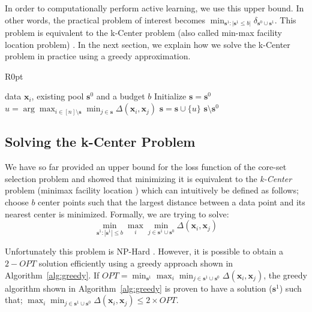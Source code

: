 \documentclass{article} \usepackage{iclr2018_conference,times}
\begin{document}
In order to computationally perform active learning, we use this upper bound. In other words, the practical problem of interest becomes $\min_{\mathbf{s}^1:|\mathbf{s}^1 \leq b|} \delta_{\mathbf{s}^0\cup \mathbf{s}^1}$. This problem is equivalent to the k-Center problem (also called min-max facility location problem) \citep{facility}. In the next section, we explain how we solve the k-Center problem in practice using a greedy approximation.{\par}

\begin{wrapfigure}{R}{0pt}
\begin{minipage}{0.44\textwidth}
\vspace{-8mm}
   \begin{algorithm}[H] 
   \caption{k-Center-Greedy} 
   \label{alg:greedy} 
   \begin{algorithmic} 
    data $\mathbf{x}_i$, existing pool $\mathbf{s}^0$ and a budget $b$ 
   \STATE Initialize $\mathbf{s}=\mathbf{s}^0$ \REPEAT \STATE $u=\arg\max_{i \in [n] \setminus \mathbf{s}} \min_{j \in \mathbf{s}} \Delta(\mathbf{x}_i, \mathbf{x}_j)$ \STATE $\mathbf{s} = \mathbf{s} \cup \{u\}$ 
    $\mathbf{s} \setminus \mathbf{s}^0$ \end{algorithmic}
\end{algorithm} 
\vspace{-10mm}
\end{minipage} 
\end{wrapfigure}  

\subsection{Solving the k-Center Problem} 
\label{sec:alg} 
We have so far provided an upper bound for the loss function of the core-set selection problem and showed that minimizing it is equivalent to the \emph{k-Center} problem (minimax facility location \citep{facility}) which can intuitively be defined as follows; choose $b$ center points such that the  largest distance between a data point and its nearest center is minimized. Formally, we are trying to solve: 
\begin{equation}
    \min_{\mathbf{s}^1:|\mathbf{s}^1| \leq b} \max_i \min_{j \in \mathbf{s}^1 \cup \mathbf{s}^0} \Delta(\mathbf{x}_i,\mathbf{x}_j)
\end{equation}

Unfortunately this problem is NP-Hard \citep{cook}. However, it is possible to obtain a $2-OPT$ solution efficiently
using a greedy approach shown in  Algorithm~\ref{alg:greedy}. If $OPT=\min_{\mathbf{s}^1} \max_i \min_{j \in
\mathbf{s}^1 \cup \mathbf{s}^0} \Delta(\mathbf{x}_i,\mathbf{x}_j)$, the greedy algorithm shown in
Algorithm~\ref{alg:greedy} is proven to have a solution ($\mathbf{s}^1$) such that; $ \max_i \min_{j \in \mathbf{s}^1
\cup \mathbf{s}^0} \Delta(\mathbf{x}_i,\mathbf{x}_j) \leq 2 \times OPT$.
\end{document}
